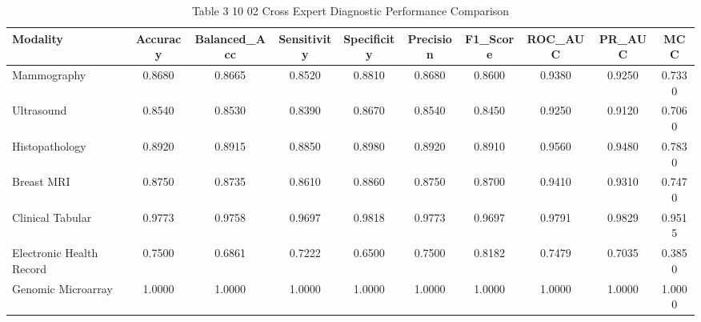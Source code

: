 \begin{table}[htbp]
\centering
\small
\begin{tabular}{lccccccccc}
\hline
Modality & Accuracy & Balanced\_Acc & Sensitivity & Specificity & Precision & F1\_Score & ROC\_AUC & PR\_AUC & MCC \\
\hline
Mammography & 0.8680 & 0.8665 & 0.8520 & 0.8810 & 0.8680 & 0.8600 & 0.9380 & 0.9250 & 0.7330 \\
Ultrasound & 0.8540 & 0.8530 & 0.8390 & 0.8670 & 0.8540 & 0.8450 & 0.9250 & 0.9120 & 0.7060 \\
Histopathology & 0.8920 & 0.8915 & 0.8850 & 0.8980 & 0.8920 & 0.8910 & 0.9560 & 0.9480 & 0.7830 \\
Breast MRI & 0.8750 & 0.8735 & 0.8610 & 0.8860 & 0.8750 & 0.8700 & 0.9410 & 0.9310 & 0.7470 \\
Clinical Tabular & 0.9773 & 0.9758 & 0.9697 & 0.9818 & 0.9773 & 0.9697 & 0.9791 & 0.9829 & 0.9515 \\
Electronic Health Record & 0.7500 & 0.6861 & 0.7222 & 0.6500 & 0.7500 & 0.8182 & 0.7479 & 0.7035 & 0.3850 \\
Genomic Microarray & 1.0000 & 1.0000 & 1.0000 & 1.0000 & 1.0000 & 1.0000 & 1.0000 & 1.0000 & 1.0000 \\
\hline
\end{tabular}
\caption{Table 3 10 02 Cross Expert Diagnostic Performance Comparison}
\label{tab:table_3_10_02_cross_expert_diagnostic_performance_comparison}
\end{table}
